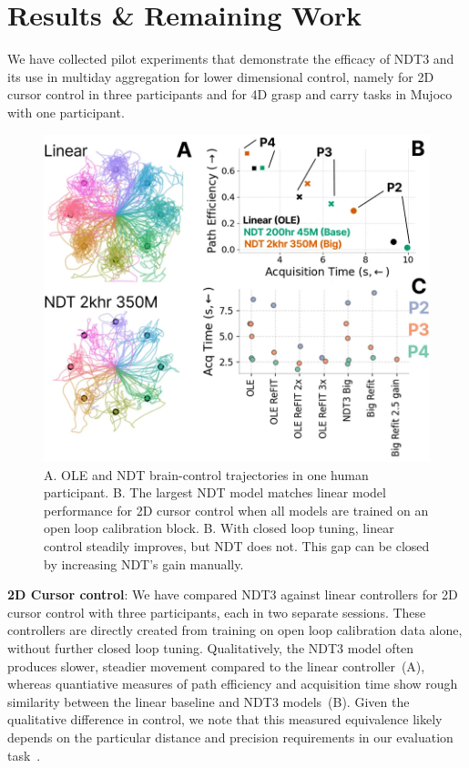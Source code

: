\documentclass[12pt,oneside]{report}
\begin{document}
\section{Results \& Remaining Work}
We have collected pilot experiments that demonstrate the efficacy of NDT3 and its use in multiday aggregation for lower dimensional control, namely for 2D cursor control in three participants and for 4D grasp and carry tasks in Mujoco with one participant.

\begin{figure}[h]
  \centering
  \includegraphics[width=0.8\linewidth]{ch3_cursor_control.png}
  \caption{A. OLE and NDT brain-control trajectories in one human participant. B. The largest NDT model matches linear model performance for 2D cursor control when all models are trained on an open loop calibration block. B. With closed loop tuning, linear control steadily improves, but NDT does not. This gap can be closed by increasing NDT's gain manually.}
  \label{fig:cursor}
\end{figure}

\textbf{2D Cursor control}: We have compared NDT3 against linear controllers for 2D cursor control with three participants, each in two separate sessions. These controllers are directly created from training on open loop calibration data alone, without further closed loop tuning. Qualitatively, the NDT3 model often produces slower, steadier movement compared to the linear controller~(A), whereas quantiative measures of path efficiency and acquisition time show rough similarity between the linear baseline and NDT3 models~(B). Given the qualitative difference in control, we note that this measured equivalence likely depends on the particular distance and precision requirements in our evaluation task~\citep{willett2017comparison}.
\end{document}
